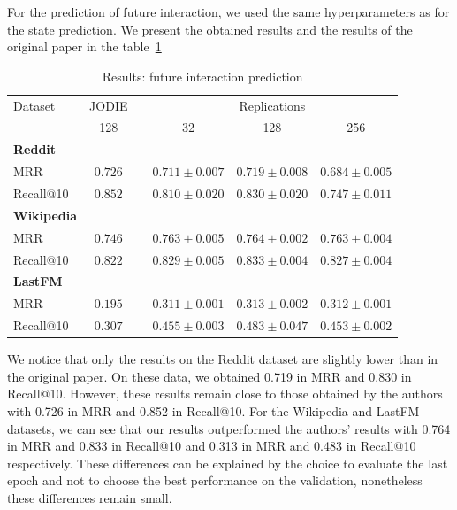 For the prediction of future interaction, we used the same hyperparameters as for the state prediction. We present the obtained results and the results of the original paper in the table~\ref{result-interaction}

\begin{table}[htbp]
    \centering
    \begin{tabular}{@{}lccccc@{}}
    \toprule
    Dataset\hspace*{3em} & JODIE & \phantom{abc} & \multicolumn{3}{c}{Replications} \\
    \cmidrule{2-2} \cmidrule{4-6}
    & 128 && \multicolumn{1}{c}{32} & \multicolumn{1}{c}{128} & \multicolumn{1}{c}{256} \\
    \midrule
    \multicolumn{1}{l}{\hspace{-0.2cm}\textbf{Reddit}} \\
    {\quad \small MRR} & $\boldsymbol{0.726}$  && $0.711 \pm 0.007$ & $0.719 \pm 0.008$ & $0.684 \pm 0.005$ \\
    {\quad\small Recall@10}  &$\boldsymbol{0.852}$ && $0.810 \pm 0.020$ & $0.830 \pm 0.020$ & $0.747 \pm 0.011$\\
    \multicolumn{1}{l}{\hspace{-0.2cm}\textbf{Wikipedia}}\\
    {\quad\small MRR} &$0.746$ && $\boldsymbol{0.763} \pm 0.005$ & $\boldsymbol{0.764} \pm 0.002$ & $\boldsymbol{0.763} \pm 0.004$  \\
    {\quad\small Recall@10}  & $0.822$ && $\boldsymbol{0.829} \pm 0.005$ & $\boldsymbol{0.833} \pm 0.004$ & $\boldsymbol{0.827} \pm 0.004$\\
    \multicolumn{1}{l}{\hspace{-0.2cm}\textbf{LastFM}} \\
    {\quad\small MRR} &$0.195$ && $\boldsymbol{0.311} \pm 0.001$ & $\boldsymbol{0.313} \pm 0.002$ & $\boldsymbol{0.312} \pm 0.001$ \\
    {\quad\small Recall@10}  & $0.307$ && $\boldsymbol{0.455} \pm 0.003$ & $\boldsymbol{0.483} \pm 0.047$ & $\boldsymbol{0.453} \pm 0.002$\\
    \bottomrule
    \end{tabular}
    \caption{Results: future interaction prediction}
    \label{result-interaction}
\end{table}

We notice that only the results on the Reddit dataset are slightly lower than in the original paper. On these data, we obtained 0.719 in MRR and 0.830 in Recall@10. However, these results remain close to those obtained by the authors with 0.726 in MRR and 0.852 in Recall@10. For the Wikipedia and LastFM datasets, we can see that our results outperformed the authors' results with 0.764 in MRR and 0.833 in Recall@10 and 0.313 in MRR and 0.483 in Recall@10 respectively. These differences can be explained by the choice to evaluate the last epoch and not to choose the best performance on the validation, nonetheless these differences remain small.\\

